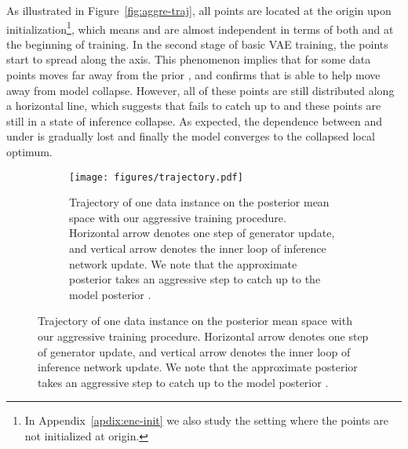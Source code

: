 \documentclass{article} \usepackage{iclr2019_conference,times}
\begin{document}
As illustrated in Figure~\ref{fig:aggre-traj}, all points are located at the origin upon initialization\footnote{In Appendix~\ref{apdix:enc-init} we also study the setting where the points are not initialized at origin.}, which means  and  are almost independent in terms of both  and  at the beginning of training.
In the second stage of basic VAE training, the points start to spread along the  axis. This phenomenon implies that for some data points  moves far away from the prior , and confirms that  is able to help move away from model collapse.
However, all of these points are still distributed along a horizontal line, which suggests that  fails to catch up to  and these points are still in a state of inference collapse. As expected, the dependence between  and  under  is gradually lost and finally the model converges to the collapsed local optimum.

\begin{figure}[!t]
\hfill
\begin{minipage}{.37\textwidth}
    \begin{figure}[H]
    \centering
    \texttt{[image: figures/trajectory.pdf]}
    \vspace{-7pt}
    \caption{Trajectory of one data instance on the posterior mean space with our aggressive training procedure. Horizontal arrow denotes one step of generator update, and vertical arrow denotes the inner loop of inference network update. We note that the approximate posterior  takes an aggressive step to catch up to the model posterior .}
    \label{fig:trajectory}
    \end{figure}
\end{minipage}
\end{figure}
\end{document}

